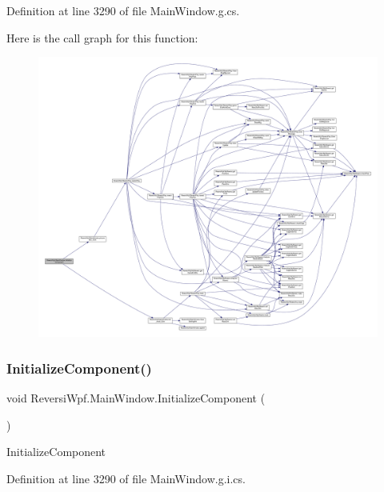 Definition at line 3290 of file Main\+Window.\+g.\+cs.

Here is the call graph for this function\+:
\nopagebreak
\begin{figure}[H]
\begin{center}
\leavevmode
\includegraphics[width=350pt]{class_reversi_wpf_1_1_main_window_a4cf9bc92cee02fa8e3b00fa56fb41c82_cgraph}
\end{center}
\end{figure}
\mbox{\label{class_reversi_wpf_1_1_main_window_a4cf9bc92cee02fa8e3b00fa56fb41c82}} 
\subsubsection{\texorpdfstring{Initialize\+Component()}{InitializeComponent()}\hspace{0.1cm}{\footnotesize\ttfamily [4/4]}}
{\footnotesize\ttfamily void Reversi\+Wpf.\+Main\+Window.\+Initialize\+Component (\begin{DoxyParamCaption}{ }\end{DoxyParamCaption})}



Initialize\+Component 



Definition at line 3290 of file Main\+Window.\+g.\+i.\+cs.

